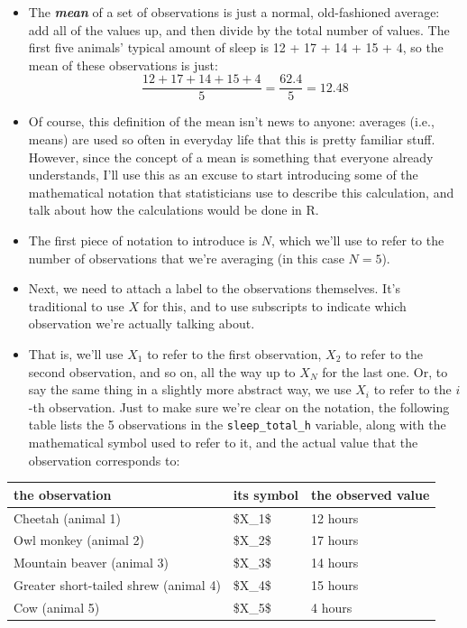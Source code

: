 \documentclass[
]{book}
\begin{document}
\begin{itemize}
\item
  The \textbf{\emph{mean}} of a set of observations is just a normal, old-fashioned average: add all of the values up, and then divide by the total number of values. The first five animals' typical amount of sleep is 12 + 17 + 14 + 15 + 4, so the mean of these observations is just:
  \[
  \frac{12 + 17 + 14 + 15 + 4}{5} = \frac{62.4}{5} = 12.48
  \]
\item
  Of course, this definition of the mean isn't news to anyone: averages (i.e., means) are used so often in everyday life that this is pretty familiar stuff. However, since the concept of a mean is something that everyone already understands, I'll use this as an excuse to start introducing some of the mathematical notation that statisticians use to describe this calculation, and talk about how the calculations would be done in R.
\item
  The first piece of notation to introduce is \(N\), which we'll use to refer to the number of observations that we're averaging (in this case \(N = 5\)).
\item
  Next, we need to attach a label to the observations themselves. It's traditional to use \(X\) for this, and to use subscripts to indicate which observation we're actually talking about.
\item
  That is, we'll use \(X_1\) to refer to the first observation, \(X_2\) to refer to the second observation, and so on, all the way up to \(X_N\) for the last one. Or, to say the same thing in a slightly more abstract way, we use \(X_i\) to refer to the \(i\)-th observation. Just to make sure we're clear on the notation, the following table lists the 5 observations in the \texttt{sleep\_total\_h} variable, along with the mathematical symbol used to refer to it, and the actual value that the observation corresponds to:
\end{itemize}

\begin{tabular}{lll}
\toprule
the observation & its symbol & the observed value\\
\midrule
Cheetah (animal 1) & \$X\_1\$ & 12 hours\\
Owl monkey (animal 2) & \$X\_2\$ & 17 hours\\
Mountain beaver (animal 3) & \$X\_3\$ & 14 hours\\
Greater short-tailed shrew (animal 4) & \$X\_4\$ & 15 hours\\
Cow (animal 5) & \$X\_5\$ & 4 hours\\
\bottomrule
\end{tabular}
\end{document}
